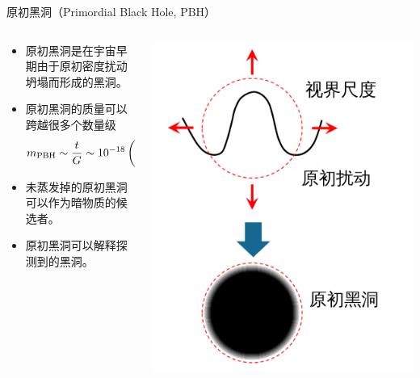 \documentclass[xcolor={svgnames},compress]{beamer}
\let\olditem\item
\renewcommand{\item}{%
    \olditem\vspace{\fill}}
\def\e{\begin{equation}}
\def\q{\end{equation}}
\begin{document}
\begin{frame}{原初黑洞（Primordial Black Hole, PBH）}
    \vspace{-3mm}
    \begin{columns}
        \begin{column}{0.7\textwidth}
            \begin{itemize}
                \item 原初黑洞是在宇宙早期由于原初密度扰动坍塌而形成的黑洞。
                \item 原初黑洞的质量可以跨越很多个数量级
                \e 
                m_{\mathrm{PBH}} \sim \frac{t}{G} \sim 10^{-18} 
                \left(
                \frac{t}{10^{-23}}
                \right) \Msun
                \q
                \item 未蒸发掉的原初黑洞可以作为暗物质的候选者。
                \item 原初黑洞可以解释\lvc 探测到的黑洞。
            \end{itemize}
        \end{column}
        \begin{column}{0.4\textwidth} 
            \includegraphics[width=\textwidth]{pbh_form} 
        \end{column}
    \end{columns}
    \vspace{2mm}
%             
\end{frame}
\end{document}
